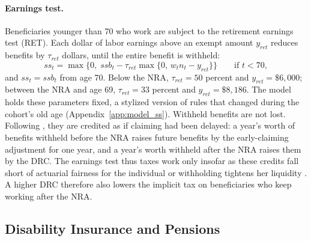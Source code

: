\paragraph{Earnings test.} Beneficiaries younger than 70 who work are subject to the retirement earnings test (RET). Each dollar of labor earnings above an exempt amount $y_{ret}$ reduces benefits by $\tau_{ret}$ dollars, until the entire benefit is withheld:
\begin{equation}\label{eq:ret}
ss_t=\max\Big\{0,\; ssb_t-\tau_{ret}\max\{0,\,w_t n_t-y_{ret}\}\Big\} \qquad \text{if } t<70,
\end{equation}
and $ss_t=ssb_t$ from age 70. Below the NRA, $\tau_{ret}=50$ percent and $y_{ret}=\$6{,}000$; between the NRA and age 69, $\tau_{ret}=33$ percent and $y_{ret}=\$8{,}186$. The model holds these parameters fixed, a stylized version of rules that changed during the cohort's old age (Appendix~\ref{app:model_ss}). Withheld benefits are not lost. Following \citet{french2011effects}, they are credited as if claiming had been delayed: a year's worth of benefits withheld before the NRA raises future benefits by the early-claiming adjustment for one year, and a year's worth withheld after the NRA raises them by the DRC. The earnings test thus taxes work only insofar as these credits fall short of actuarial fairness for the individual or withholding tightens her liquidity \citep[see][for evidence on its employment effects]{gelber2020employment}. A higher DRC therefore also lowers the implicit tax on beneficiaries who keep working after the NRA.

\subsection{Disability Insurance and Pensions}\label{sec:model_di}


